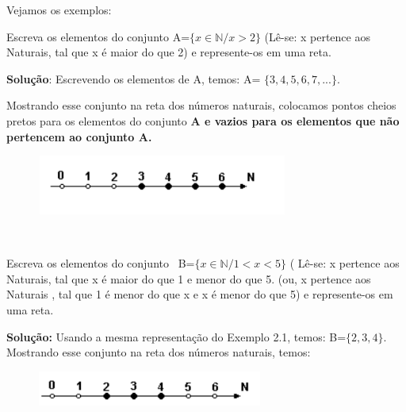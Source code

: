 Vejamos os exemplos:

\begin{texemplo}
	
	Escreva os elementos do conjunto  A=$ \{ x \in \mathbb{N}  / x > 2 \} $  (Lê-se: x pertence aos Naturais, tal que x é maior do que 2) e represente-os em uma reta.

\textbf{Solução}: Escrevendo os elementos de A, temos: A= $ \{ 3,4,5,6,7,... \}$.

Mostrando esse conjunto na reta dos números naturais, colocamos pontos cheios pretos para os elementos do conjunto \textbf{A e vazios para os elementos que não pertencem ao conjunto A.}

\begin{figure}[H]
	\begin{Center}
		\includegraphics[width=3.26in,height=0.77in]{capitulos/conjuntos_numericos/media/image3.pdf}
	\end{Center}
\end{figure}

~~
\end{texemplo}

\begin{texemplo} 
	Escreva os elementos do conjunto~ B=$ \{ x \in \mathbb{N}  / 1< x <5 \} $  ( Lê-se: x pertence aos Naturais, tal que x é maior do que 1 e menor do que 5. (ou, x pertence aos Naturais , tal que 1 é menor do que x e x é menor do que 5) e represente-os em uma reta.

\textbf{Solução:} Usando a mesma representação do Exemplo 2.1, temos: B=$ \{ 2,3,4 \} $. Mostrando esse conjunto na reta dos números naturais, temos:

\begin{figure}[H]
	\begin{Center}
		\includegraphics[width=2.93in,height=0.45in]{capitulos/conjuntos_numericos/media/image4.pdf}
	\end{Center}
\end{figure}
\end{texemplo}

